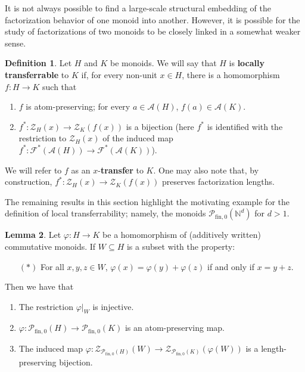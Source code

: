\documentclass{report}
\newcommand{\A}{\mathcal{A}}
\newcommand{\F}{\mathcal{F}}
\newcommand{\NN}{\mathbb{N}}
\renewcommand{\P}{\mathcal{P}}
\newcommand{\Z}{\mathcal{Z}}
\newcommand{\fon}{{\textrm{fin}, 0}}
\renewcommand{\:}{\text{:}}
\theoremstyle{definition}
\newtheorem{defn}{Definition}[section]
\newtheorem{lemma}[defn]{Lemma}
\begin{document}
It is not always possible to find a large-scale structural embedding of the factorization behavior of one monoid into another.  
However, it is possible for the study of factorizations of two monoids to be closely linked in a somewhat weaker sense.

\begin{defn} \label{def:local transfer}
Let $H$ and $K$ be monoids. 
We will say that $H$ is \textbf{locally transferrable} to $K$ if, for every non-unit $x\in H$, there is a homomorphism $f: H \to K$ such that 
\begin{enumerate}[label={\rm (\roman{*})}]
	\item $f$ is atom-preserving; for every $a\in \A(H)$, $f(a)\in \A(K)$.
	\item $f^*:\Z_H(x) \to \Z_K(f(x))$ is a bijection (here $f^*$ is identified with the restriction to $\Z_H(x)$ of the induced map $f^*: \F^*(\A(H)) \to \F^*(\A(K))$).
\end{enumerate}
We will refer to $f$ as an $x$-\textbf{transfer} to $K$.
One may also note that, by construction, $f^*:\Z_H(x) \to \Z_K(f(x))$ preserves factorization lengths.
\end{defn}

The remaining results in this section highlight the motivating example for the definition of local transferrability; namely, the monoids $\P_\fon(\NN^d)$ for $d>1$.

\begin{lemma}\label{lem:local-transport}
Let $\varphi: H \to K$ be a homomorphism of (additively written) commutative monoids. 
If $W\subseteq H$ is a subset with the property:
\begin{itemize}
\item[$(*)$] For all $x,y,z\in W$, $\varphi(x) = \varphi(y) + \varphi(z)$ if and only if $x = y + z$.
\end{itemize}
Then we have that
\begin{enumerate}[label={\rm (\roman{*})}]
\item The restriction $\varphi|_W$ is injective.
\item $\varphi:\P_\fon(H) \to \P_\fon(K)$ is an atom-preserving map.
\item The induced map $\varphi:\Z_{\P_\fon(H)}(W) \to \Z_{\P_\fon(K)}(\varphi(W))$ is a length-preserving bijection.
\end{enumerate}
\end{lemma}
\end{document}
